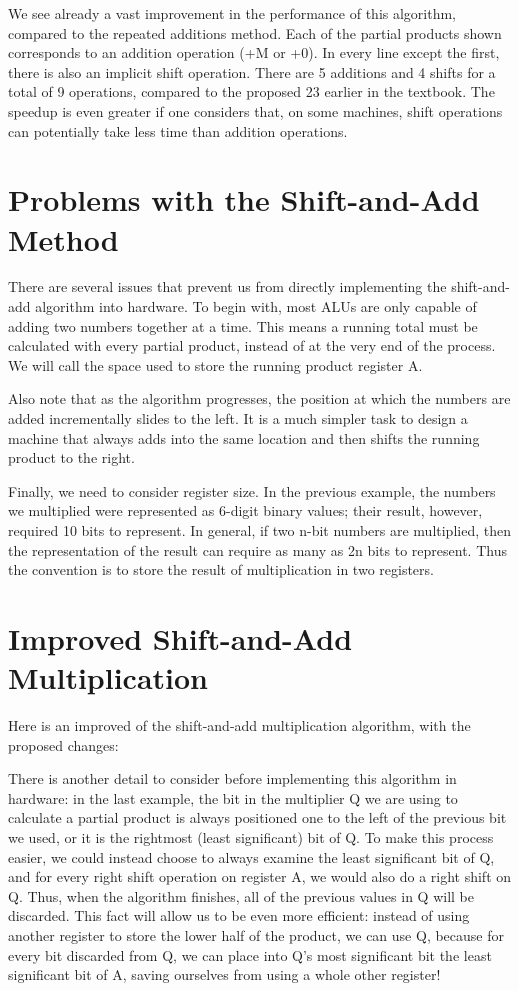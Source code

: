 \documentclass{article}
\begin{document}
We see already a vast improvement in the performance of this algorithm, compared to the repeated additions method.
Each of the partial products shown corresponds to an addition operation (+M or +0).
In every line except the first, there is also an implicit shift operation.
There are 5 additions and 4 shifts for a total of 9 operations, compared to the proposed 23 earlier in the textbook.
The speedup is even greater if one considers that, on some machines, shift operations can potentially take less time than addition operations.

\section{Problems with the Shift-and-Add Method}
There are several issues that prevent us from directly implementing the shift-and-add algorithm into hardware.
To begin with, most ALUs are only capable of adding two numbers together at a time.
This means a running total must be calculated with every partial product, instead of at the very end of the process.
We will call the space used to store the running product register A.

Also note that as the algorithm progresses, the position at which the numbers are added incrementally slides to the left.
It is a much simpler task to design a machine that always adds into the same location and then shifts the running product to the right.

Finally, we need to consider register size.
In the previous example, the numbers we multiplied were represented as 6-digit binary values; their result, however, required 10 bits to represent.
In general, if two n-bit numbers are multiplied, then the representation of the result can require as many as 2n bits to represent.
Thus the convention is to store the result of multiplication in two registers.

\section{Improved Shift-and-Add Multiplication}
Here is an improved of the shift-and-add multiplication algorithm, with the proposed changes: %

There is another detail to consider before implementing this algorithm in hardware: in the last example, the bit in the multiplier Q we are using to calculate a partial product is always positioned one to the left of the previous bit we used, or it is the rightmost (least significant) bit of Q.
To make this process easier, we could instead choose to always examine the least significant bit of Q, and for every right shift operation on register A, we would also do a right shift on Q.
Thus, when the algorithm finishes, all of the previous values in Q will be discarded.
This fact will allow us to be even more efficient: instead of using another register to store the lower half of the product, we can use Q, because for every bit discarded from Q, we can place into Q's most significant bit the least significant bit of A, saving ourselves from using a whole other register!
\end{document}
